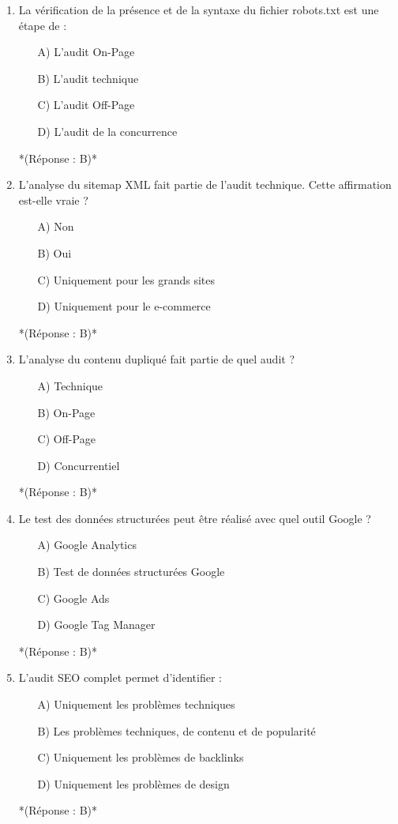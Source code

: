 \documentclass[12pt,a4paper,twoside]{report}
\begin{document}
\begin{enumerate}
    \item La vérification de la présence et de la syntaxe du fichier robots.txt est une étape de :
    \begin{itemize}
        \item[A)] L'audit On-Page
        \item[B)] L'audit technique
        \item[C)] L'audit Off-Page
        \item[D)] L'audit de la concurrence
    \end{itemize}
    *(Réponse : B)*

    \item L'analyse du sitemap XML fait partie de l'audit technique. Cette affirmation est-elle vraie ?
    \begin{itemize}
        \item[A)] Non
        \item[B)] Oui
        \item[C)] Uniquement pour les grands sites
        \item[D)] Uniquement pour le e-commerce
    \end{itemize}
    *(Réponse : B)*

    \item L'analyse du contenu dupliqué fait partie de quel audit ?
    \begin{itemize}
        \item[A)] Technique
        \item[B)] On-Page
        \item[C)] Off-Page
        \item[D)] Concurrentiel
    \end{itemize}
    *(Réponse : B)*

    \item Le test des données structurées peut être réalisé avec quel outil Google ?
    \begin{itemize}
        \item[A)] Google Analytics
        \item[B)] Test de données structurées Google
        \item[C)] Google Ads
        \item[D)] Google Tag Manager
    \end{itemize}
    *(Réponse : B)*

    \item L'audit SEO complet permet d'identifier :
    \begin{itemize}
        \item[A)] Uniquement les problèmes techniques
        \item[B)] Les problèmes techniques, de contenu et de popularité
        \item[C)] Uniquement les problèmes de backlinks
        \item[D)] Uniquement les problèmes de design
    \end{itemize}
    *(Réponse : B)*


\end{enumerate}
\end{document}

